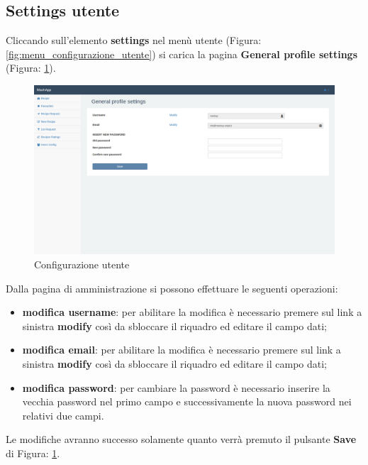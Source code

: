 	\subsection{Settings utente} %
	\label{sec:settings_utente}
		Cliccando sull'elemento \textbf{settings} nel menù utente (Figura: \ref{fig:menu_configurazione_utente}) si carica la pagina \textbf{General profile settings} (Figura: \ref{fig:configurazione_utente}).
		\begin{figure}[htbp]
			\centering
			\centerline{\includegraphics[width=14cm]{images/configurazione_utente.png}}
			\caption{Configurazione utente}
			\label{fig:configurazione_utente}
		\end{figure}
		Dalla pagina di amministrazione si possono effettuare le seguenti operazioni:
		\begin{itemize}
			\item \textbf{modifica username}: per abilitare la modifica è necessario premere sul link a sinistra \textbf{modify} così da sbloccare il riquadro ed editare il campo dati;
			\item \textbf{modifica email}: per abilitare la modifica è necessario premere sul link a sinistra \textbf{modify} così da sbloccare il riquadro ed editare il campo dati;
			\item \textbf{modifica password}: per cambiare la password è necessario inserire la vecchia password nel primo campo e successivamente la nuova password nei relativi due campi.
		\end{itemize}
		Le modifiche avranno successo solamente quanto verrà premuto il pulsante \textbf{Save} di Figura: \ref{fig:configurazione_utente}.


